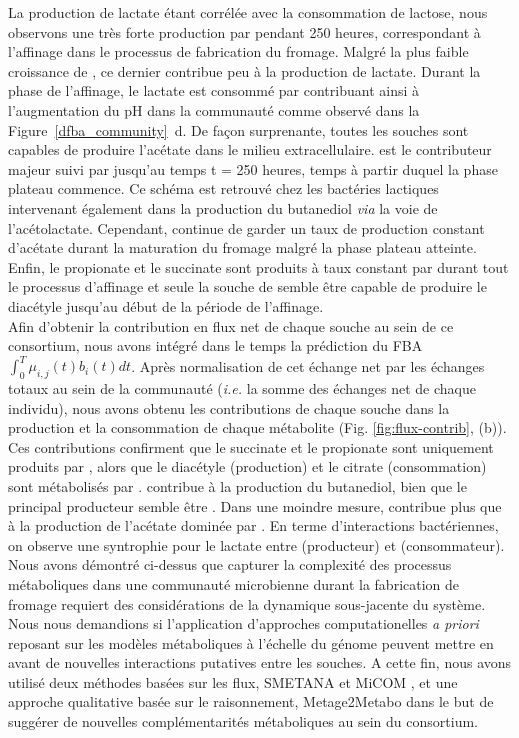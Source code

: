 La production de lactate étant corrélée avec la consommation de lactose, nous observons une très forte production par \lactis pendant 250 heures, correspondant à l'affinage dans le processus de fabrication du fromage. Malgré la plus faible croissance de \plantarum, ce dernier contribue peu à la production de lactate. Durant la phase de l'affinage, le lactate est consommé par \freud contribuant ainsi à l'augmentation du pH dans la communauté comme observé dans la Figure~\ref{dfba_community}~d. De façon surprenante, toutes les souches sont capables de produire l'acétate dans le milieu extracellulaire. \lactis est le contributeur majeur suivi par \plantarum jusqu'au temps t = 250 heures, temps à partir duquel la phase plateau commence. Ce schéma est retrouvé chez les bactéries lactiques intervenant également dans la production du butanediol \textit{via} la voie de l'acétolactate. Cependant, \freud continue de garder un taux de production constant d'acétate durant la maturation du fromage malgré la phase plateau atteinte. Enfin, le propionate et le succinate sont produits à taux constant par \freud durant tout le processus d'affinage et seule la souche de \lactis semble être capable de produire le diacétyle jusqu'au début de la période de l'affinage.\\

Afin d'obtenir la contribution en flux net de chaque souche au sein de ce consortium, nous avons intégré dans le temps la prédiction du FBA $\int_0^T \mu_{i,j}(t) b_i(t) dt$. Après normalisation de cet échange net par les échanges totaux au sein de la communauté (\textit{i.e.} la somme des échanges net de chaque individu), nous avons obtenu les contributions de chaque souche dans la production et la consommation de chaque métabolite (Fig. \ref{fig:flux-contrib}, (b)). Ces contributions confirment que le succinate et le propionate sont uniquement produits par \freud, alors que le diacétyle (production) et le citrate (consommation) sont métabolisés par \lactis. \plantarum contribue à la production du butanediol, bien que le principal producteur semble être \lactis. Dans une moindre mesure, \lactis contribue plus que \plantarum à la production de l'acétate dominée par \freud. En terme d'interactions bactériennes, on observe une syntrophie pour le lactate entre \lactis (producteur) et \freud (consommateur).\\

Nous avons démontré ci-dessus que capturer la complexité des processus métaboliques dans une communauté microbienne durant la fabrication de fromage requiert des considérations de la dynamique sous-jacente  du système. Nous nous demandions si l'application d'approches computationelles \textit{a priori} reposant sur les modèles métaboliques à l'échelle du génome peuvent mettre en avant de nouvelles interactions putatives entre les souches. A cette fin, nous avons utilisé deux méthodes basées sur les flux, SMETANA \citep{Zelezniak2015} et MiCOM \citep{diener2020}, et une approche qualitative basée sur le raisonnement, Metage2Metabo \citep{Belcour.2020} dans le but de suggérer de nouvelles complémentarités métaboliques au sein du consortium.

